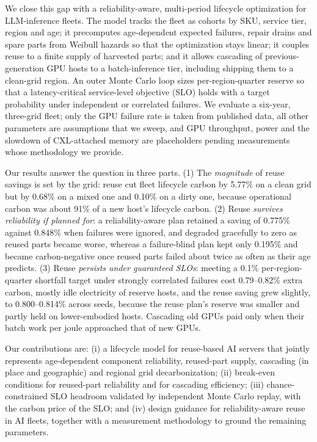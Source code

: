 \documentclass[11pt]{article}
\begin{document}
We close this gap with a reliability-aware, multi-period lifecycle optimization for LLM-inference fleets. The model tracks the fleet as cohorts by SKU, service tier, region and age; it precomputes age-dependent expected failures, repair drains and spare parts from Weibull hazards so that the optimization stays linear; it couples reuse to a finite supply of harvested parts; and it allows cascading of previous-generation GPU hosts to a batch-inference tier, including shipping them to a clean-grid region. An outer Monte Carlo loop sizes per-region-quarter reserve so that a latency-critical service-level objective (SLO) holds with a target probability under independent or correlated failures. We evaluate a six-year, three-grid fleet; only the GPU failure rate is taken from published data, all other parameters are assumptions that we sweep, and GPU throughput, power and the slowdown of CXL-attached memory are placeholders pending measurements whose methodology we provide.

Our results answer the question in three parts. (1) The \emph{magnitude} of reuse savings is set by the grid: reuse cut fleet lifecycle carbon by 5.77\% on a clean grid but by 0.68\% on a mixed one and 0.10\% on a dirty one, because operational carbon was about 91\% of a new host's lifecycle carbon. (2) Reuse \emph{survives reliability if planned for}: a reliability-aware plan retained a saving of 0.775\% against 0.848\% when failures were ignored, and degraded gracefully to zero as reused parts became worse, whereas a failure-blind plan kept only 0.195\% and became carbon-negative once reused parts failed about twice as often as their age predicts. (3) Reuse \emph{persists under guaranteed SLOs}: meeting a 0.1\% per-region-quarter shortfall target under strongly correlated failures cost 0.79--0.82\% extra carbon, mostly idle electricity of reserve hosts, and the reuse saving grew slightly, to 0.800--0.814\% across seeds, because the reuse plan's reserve was smaller and partly held on lower-embodied hosts. Cascading old GPUs paid only when their batch work per joule approached that of new GPUs.

Our contributions are: (i) a lifecycle model for reuse-based AI servers that jointly represents age-dependent component reliability, reused-part supply, cascading (in place and geographic) and regional grid decarbonization; (ii) break-even conditions for reused-part reliability and for cascading efficiency; (iii) chance-constrained SLO headroom validated by independent Monte Carlo replay, with the carbon price of the SLO; and (iv) design guidance for reliability-aware reuse in AI fleets, together with a measurement methodology to ground the remaining parameters.
\end{document}
